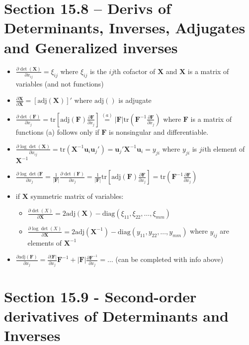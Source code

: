 \documentclass[a4paper]{article}
\newcommand{\tr}{\text{tr}}
\newcommand{\adj}{\text{adj}}
\newcommand{\diag}{\text{diag}}
\newcommand{\mb}{\mathbf}
\begin{document}
\section*{Section 15.8 -- Derivs of Determinants, Inverses, Adjugates and Generalized inverses}
\begin{itemize}
\item $\frac{\partial \det(\mb{X})}{\partial x_{ij} }=\xi_{ij}$ where $\xi_{ij}$ is the $ij$th cofactor of $\mb{X}$ and $\mb{X}$ is a matrix of variables (and not functions)
\item $\frac{\partial \mb{X}}{\partial \mb{X}} = [\adj(\mb{X})]'$ where $\adj()$ is adjugate
\item $\frac{\partial \det(\mb{F})}{\partial x_{j} }=\tr\left[\adj(\mb{F})\frac{\partial \mb{F}}{\partial x_j}\right]\stackrel{(a)}{=}|\mb{F}|\tr\left(\mb{F}^{-1}\frac{\partial\mb{F}}{\partial x_j}\right)$ where $\mb{F}$ is a matrix of functions (a) follows only if $\mb{F}$ is nonsingular and differentiable.
\item $\frac{\partial \log\det(\mb{X})}{\partial x_{ij}}=\tr({\mb{X}^{-1}\mb{u}_i\mb{u}_j'})=\mb{u}_j'\mb{X}^{-1}\mb{u}_i=y_{ji}$ where $y_{ji}$ is $ji$th element of $\mb{X}^{-1}$
\item $\frac{\partial \log \det (\mb{F}}{\partial x_j } = \frac{1}{|\mb{F}|} \frac{\partial\det(\mb{F})}{\partial x_j} = \frac{1}{|\mb{F}|}\tr\left[\adj(\mb{F})\frac{\partial \mb{F}}{ \partial x_j}\right]=\tr\left(\mb{F}^{-1}\frac{\partial \mb{F}}{\partial x_j}\right)$
\item if $\mb{X}$ symmetric matrix of variables:
\begin{itemize}
\item $\frac{\partial\det(X)}{\partial\mb{X}}=2\adj(\mb{X})-\diag(\xi_{11}, \xi_{22}, \hdots, \xi_{mm})$
\item $\frac{\partial\log\det(X)}{\partial\mb{X}}=2\adj(\mb{X}^{-1})-\diag(y_{11}, y_{22}, \hdots, y_{mm})$ where $y_{ij}$ are elements of $\mb{X}^{-1}$
\end{itemize}
\item $\frac{\partial \adj(\mb{F})}{\partial x_j}=\frac{\partial|\mb{F}|}{\partial x_j}\mb{F}^{-1}+|\mb{F}|\frac{\partial \mb{F}^{-1}}{\partial x_j}=\hdots$ (can be completed with info above)
\end{itemize}
\section*{Section 15.9 \-- Second-order derivatives of Determinants and Inverses}
\end{document}
